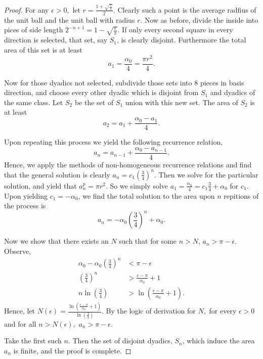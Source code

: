 \documentclass[letter]{article}
\newenvironment{menumerate}{%
  \edef\backupindent{\the\parindent}%
  \enumerate%
  \setlength{\parindent}{\backupindent}%
}{\endenumerate}
\begin{document}
\begin{menumerate}
\begin{menumerate}
				\begin{proof}
				 	For any $\epsilon > 0,$ let $r = \frac{1+\sqrt{\frac{\epsilon}{\pi}}}{2}.$ Clearly such a point is the average radfius of the unit ball and the unit ball with radius $r.$ Now as before, divide the inside into pices of side length $2^{-n+1} = 1 - \sqrt{\frac{\epsilon}{\pi}}. $ If only every second square in every direction is selected, that set, say $S_1$, is clearly disjoint. Furthermore the total area of this set is at least $$a_1 = \frac{\alpha_0}{4} = \frac{\pi r^2}{4}.$$

				 	Now for those dyadics not selected, subdivide those sets into $8$ pieces in basis direction, and choose every other dyadic which is disjoint from $S_1$ and dyadics of the same class. Let $S_2$ be the set of $S_1$ union with this new set. The area of $S_2$ is at least  
				 	$$a_2 = a_1 + \frac{\alpha_0-a_1}{4}.$$

				 	Upon repeating this process we yield the following recurrence relation, $$a_n = a_{n-1} + \frac{\alpha_0-a_{n-1}}{4}.$$ Hence, we apply the methods of non-homogeneous recurrence relations and find that the general solution is clearly $a_n = c_1\left(\frac34\right)^n$. Then we solve for the particular solution, and yield that $a_n^p = \pi r^2.$ So we simply solve $a_1 = \frac{\alpha_0}{4}=c_1\frac34 + \alpha_0$ for $c_1.$ Upon yielding $c_1 = -\alpha_0$, we find the total solution to the area upon $n$ repitions of the process is 
				 	$$a_n = -\alpha_0\left(\frac34\right)^n + \alpha_0.$$

				 	Now we show that there exists an $N$ such that for some $n > N$, $a_n > \pi - \epsilon.$ Observe, \begin{equation}
				 		\begin{aligned}
				 			\alpha_0 - \alpha_0\left(\frac34\right)^n &< \pi - \epsilon \\
				 			 \left(\frac34\right)^n &> \frac{\epsilon-\pi}{\alpha_0} + 1 \\
				 			 	n \ln\left(\frac34\right) &> \ln\left(\frac{\epsilon-\pi}{\alpha_0} + 1\right).
				 		\end{aligned}
				 	\end{equation} Hence, let $N(\epsilon) = \frac{\ln\left(\frac{\epsilon-\pi}{\alpha_0} + 1\right)}{\ln\left(\frac34\right)} $. By the logic of derivation for $N,$ for every $\epsilon > 0$ and for all $n > N(\epsilon),$ $a_n > \pi - \epsilon.$ 

				 	Take the first such $n.$ Then the set of disjoint dyadics, $S_n$, which induce the area $a_n$ is finite, and the proof is complete.
				\end{proof}


\end{menumerate}
\end{menumerate}
\end{document}
